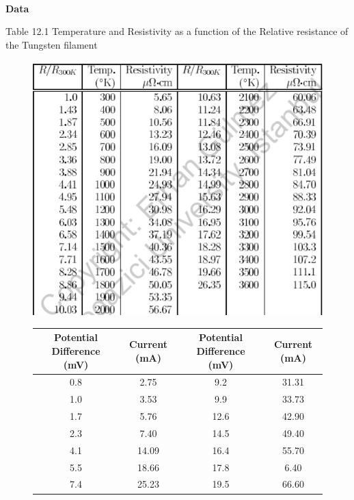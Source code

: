 \documentclass[10pt,a4paper]{article}
\begin{document}
{\begin{enumerate}
	\\[\baselineskip]
\end{enumerate}
\textbf{Data}\\[\baselineskip]
\par Table 12.1 Temperature and Resistivity as a function of the Relative resistance of the Tungsten filament
\begin{figure}[H]
	\begin{center}
		\includegraphics[scale=0.7]{table.png}
	\end{center}
\end{figure}
\begin{center}
	\begin{figure} [H] 
		\begin{tabular}{|c |c||c|c|} \hline
			Potential Difference (mV)& Current (mA) & Potential Difference (mV)& Current (mA)\\ [0.5ex] 
			\hline
			0.8 & 2.75 & 9.2 &31.31\\
			\hline
			1.0 & 3.53 &9.9 & 33.73\\
			\hline 
			1.7 & 5.76 & 12.6 & 42.90\\
			\hline 
			2.3 & 7.40 & 14.5 & 49.40\\
			\hline 
			4.1 & 14.09 & 16.4 & 55.70\\
			\hline 
			5.5 & 18.66 & 17.8 & 6.40\\
			\hline 
			7.4 & 25.23 & 19.5 & 66.60\\
			\hline
		\end{tabular}

\end{figure}
\end{center}}
\end{document}
